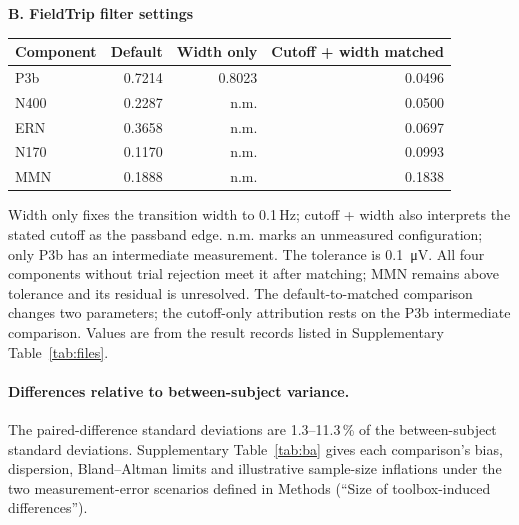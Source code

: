 \begin{table}[!htbp]
\par\medskip
\textbf{B. FieldTrip filter settings}\par\smallskip
\begin{tabular}{lrrr}
\toprule
Component & Default & Width only & Cutoff + width matched \\
\midrule
P3b & 0.7214 & 0.8023 & 0.0496 \\
N400 & 0.2287 & n.m. & 0.0500 \\
ERN & 0.3658 & n.m. & 0.0697 \\
N170 & 0.1170 & n.m. & 0.0993 \\
MMN & 0.1888 & n.m. & 0.1838 \\
\bottomrule
\end{tabular}
\par\smallskip
\begin{minipage}{\linewidth}\footnotesize
Width only fixes the transition width to 0.1\,Hz; cutoff + width also interprets the stated cutoff as the passband edge. n.m. marks an unmeasured configuration; only P3b has an intermediate measurement. The tolerance is \SI{0.1}{\uV}. All four components without trial rejection meet it after matching; MMN remains above tolerance and its residual is unresolved. The default-to-matched comparison changes two parameters; the cutoff-only attribution rests on the P3b intermediate comparison. Values are from the result records listed in Supplementary Table~\ref*{tab:files}.
\end{minipage}
\end{table}
\paragraph{Differences relative to between-subject variance.}

The paired-difference standard deviations are 1.3--11.3\,\% of the between-subject standard deviations. Supplementary Table~\ref*{tab:ba} gives each comparison's bias, dispersion, Bland--Altman limits and illustrative sample-size inflations under the two measurement-error scenarios defined in Methods (``Size of toolbox-induced differences'').

